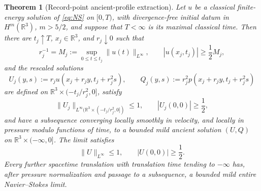 \documentclass[11pt]{amsart}
\numberwithin{equation}{section}
\theoremstyle{plain}
\newtheorem{theorem}{Theorem}[section]
\theoremstyle{definition}
\theoremstyle{remark}
\newcommand{\R}{\mathbb R}
\begin{document}
\begin{theorem}[Record-point ancient-profile extraction]
\label{thm:record-point-ancient-extraction}
Let \(u\) be a classical finite-energy solution of \eqref{eq:NS} on
\([0,T)\), with divergence-free initial datum in \(H^m(\R^3)\),
\(m>5/2\), and suppose that \(T<\infty\) is its maximal classical time.
Then there are \(t_j\uparrow T\), \(x_j\in\R^3\), and \(r_j\downarrow0\)
such that
\begin{equation}\label{eq:record-point-choice}
 r_j^{-1}=M_j:=\sup_{0\le t\le t_j}\|u(t)\|_{L^\infty},
 \qquad |u(x_j,t_j)|\ge\frac12M_j,
\end{equation}
and the rescaled solutions
\begin{equation}\label{eq:record-point-rescaling}
 U_j(y,s):=r_j u(x_j+r_jy,t_j+r_j^2s),
 \qquad
 Q_j(y,s):=r_j^2p(x_j+r_jy,t_j+r_j^2s)
\end{equation}
are defined on \(\R^3\times(-t_j/r_j^2,0]\), satisfy
\begin{equation}\label{eq:record-profile-bound}
 \|U_j\|_{L^\infty(\R^3\times(-t_j/r_j^2,0])}\le1,
 \qquad |U_j(0,0)|\ge\frac12,
\end{equation}
and have a subsequence converging locally smoothly in velocity, and locally
in pressure modulo functions of time, to a bounded mild ancient solution
\((U,Q)\) on \(\R^3\times(-\infty,0]\).  The limit satisfies
\begin{equation}\label{eq:record-profile-nonzero}
 \|U\|_{L^\infty}\le1,
 \qquad |U(0,0)|\ge\frac12.
\end{equation}
Every further spacetime translation with translation time tending to
\(-\infty\) has, after pressure normalization and passage to a subsequence,
a bounded mild \emph{entire} Navier--Stokes limit.
\end{theorem}
\end{document}
